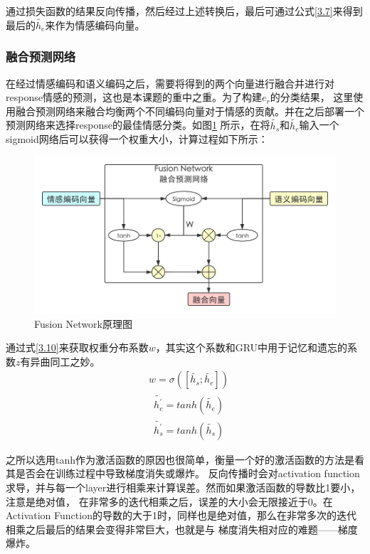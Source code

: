 \documentclass[supercite]{HustGraduPaper}
\theoremstyle{definition}
\begin{document}
通过损失函数的结果反向传播，然后经过上述转换后，最后可通过公式\ref{3.7}来得到最后的$\widetilde{h_e}$来作为情感编码向量。

\subsubsection{融合预测网络}
在经过情感编码和语义编码之后，需要将得到的两个向量进行融合并进行对response情感的预测，这也是本课题的重中之重。为了构建$e_r$的分类结果，
这里使用融合预测网络来融合均衡两个不同编码向量对于情感的贡献。并在之后部署一个预测网络来选择response的最佳情感分类。如图\ref{Fig.fusionnetwork}
所示，在将$\widetilde{h_s}$和$\widetilde{h_e}$输入一个sigmoid网络后可以获得一个权重大小，计算过程如下所示：

\begin{figure}[htbp] %
  \centering %
  \includegraphics[width=1\textwidth]{images/fusionnetwork.png} %
  \caption{Fusion Network原理图} %
  \label{Fig.fusionnetwork} %
\end{figure}
通过式\ref{3.10}来获取权重分布系数$w$，其实这个系数和GRU中用于记忆和遗忘的系数$z$有异曲同工之妙。
\begin{align}
  &w = \sigma([\widetilde{h_s};\widetilde{h_e}]) \label{3.10}
\end{align}
\begin{align}
  &{\widetilde{h_e^{'}}} = tanh(\widetilde{h_e}) \label{3.11}\\
  &{\widetilde{h_s^{'}}} = tanh(\widetilde{h_s}) \label{3.12}
\end{align}

之所以选用tanh作为激活函数的原因也很简单，衡量一个好的激活函数的方法是看其是否会在训练过程中导致梯度消失或爆炸。
反向传播时会对activation function求导，并与每一个layer进行相乘来计算误差。然而如果激活函数的导数比1要小，注意是绝对值，
在非常多的迭代相乘之后，误差的大小会无限接近于0。在Activation Function的导数的大于1时，同样也是绝对值，那么在非常多次的迭代相乘之后最后的结果会变得非常巨大，也就是与
梯度消失相对应的难题——梯度爆炸。
\end{document}
